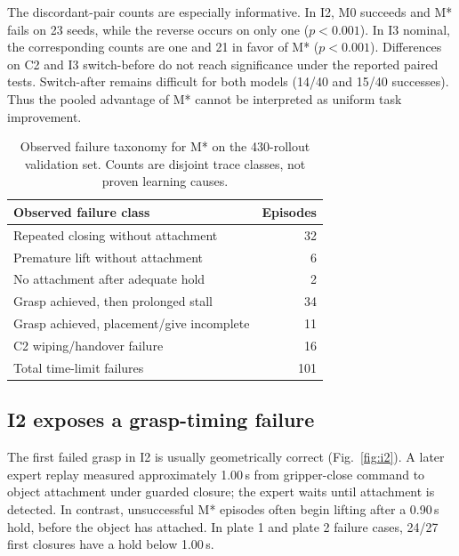 \documentclass[conference]{IEEEtran}
\begin{document}
The discordant-pair counts are especially informative. In I2, M0 succeeds and M* fails on 23 seeds, while the reverse occurs on only one ($p<0.001$). In I3 nominal, the corresponding counts are one and 21 in favor of M* ($p<0.001$). Differences on C2 and I3 switch-before do not reach significance under the reported paired tests. Switch-after remains difficult for both models (14/40 and 15/40 successes). Thus the pooled advantage of M* cannot be interpreted as uniform task improvement.


\begin{table}[t]
\caption{Observed failure taxonomy for M* on the 430-rollout validation set. Counts are disjoint trace classes, not proven learning causes.}
\label{tab:taxonomy}
\centering\footnotesize
\begin{tabular}{lr}
\toprule
Observed failure class & Episodes\\
\midrule
Repeated closing without attachment & 32\\
Premature lift without attachment & 6\\
No attachment after adequate hold & 2\\
Grasp achieved, then prolonged stall & 34\\
Grasp achieved, placement/give incomplete & 11\\
C2 wiping/handover failure & 16\\
\midrule
Total time-limit failures & 101\\
\bottomrule
\end{tabular}
\end{table}

\subsection{I2 exposes a grasp-timing failure}
The first failed grasp in I2 is usually geometrically correct (Fig.~\ref{fig:i2}). A later expert replay measured approximately 1.00\,s from gripper-close command to object attachment under guarded closure; the expert waits until attachment is detected. In contrast, unsuccessful M* episodes often begin lifting after a 0.90\,s hold, before the object has attached. In plate 1 and plate 2 failure cases, 24/27 first closures have a hold below 1.00\,s.
\end{document}
